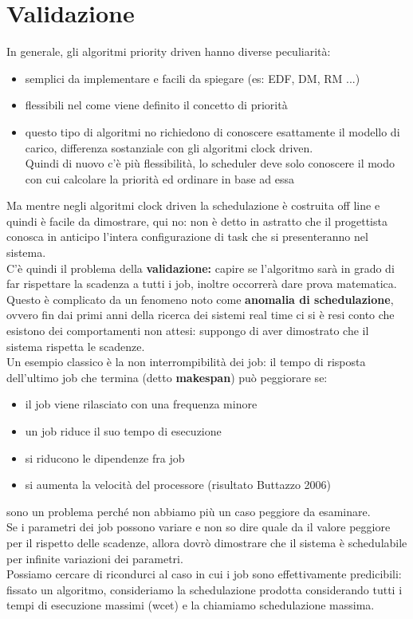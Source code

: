 \documentclass[12pt, oneside]{extbook}
\begin{document}
\section{Validazione}
In generale, gli algoritmi priority driven hanno diverse peculiarità:
\begin{itemize}
	\item semplici da implementare e facili da spiegare (es: EDF, DM, RM ...)
	\item flessibili nel come viene definito il concetto di priorità
	\item questo tipo di algoritmi no richiedono di conoscere esattamente il modello di carico, differenza sostanziale con gli algoritmi clock driven.\\
	Quindi di nuovo c'è più flessibilità, lo scheduler deve solo conoscere il modo con cui calcolare la priorità ed ordinare in base ad essa
\end{itemize}
Ma mentre negli algoritmi clock driven la schedulazione è costruita off line e quindi è facile da dimostrare, qui no: non è detto in astratto che il progettista conosca in anticipo l'intera configurazione di task che si presenteranno nel sistema.\\
C'è quindi il problema della \textbf{validazione:} capire se l'algoritmo sarà in grado di far rispettare la scadenza a tutti i job, inoltre occorrerà dare prova matematica.\\
Questo è complicato da un fenomeno noto come \textbf{anomalia di schedulazione}, ovvero fin dai primi anni della ricerca dei sistemi real time ci si è resi conto che esistono dei comportamenti non attesi: suppongo di aver dimostrato che il sistema rispetta le scadenze.\\
Un esempio classico è la non interrompibilità dei job: il tempo di risposta dell'ultimo job che termina (detto \textbf{makespan}) può peggiorare se:
\begin{itemize}
		\item il job viene rilasciato con una frequenza minore
		\item un job riduce il suo tempo di esecuzione
		\item si riducono le dipendenze fra job
		\item si aumenta la velocità del processore (risultato Buttazzo 2006)
\end{itemize}
sono un problema perché non abbiamo più un caso peggiore da esaminare.\\
Se i parametri dei job possono variare e non so dire quale da il valore peggiore per il rispetto delle scadenze, allora dovrò dimostrare che il sistema è schedulabile per infinite variazioni dei parametri.\\
Possiamo cercare di ricondurci al caso in cui i job sono effettivamente predicibili: fissato un algoritmo, consideriamo la schedulazione prodotta considerando tutti i tempi di esecuzione massimi (wcet) e la chiamiamo schedulazione massima.
\end{document}
